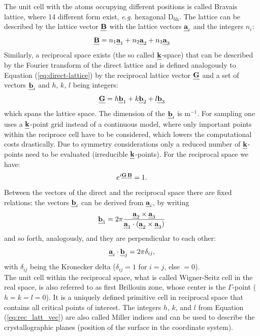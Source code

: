\documentclass[11pt,DIV=13,BCOR=5mm,a4paper,headinclude]{scrbook}
\def\mathbi#1{\textbf{\em #1}}
\renewcommand{\vec}[1]{\mathbi{#1}}
\begin{document}
The unit cell with the atoms occupying different positions is called Bravais lattice, where 14 different form exist, \textit{e.g.} hexagonal D$_\textrm{6h}$.
The lattice can be described by the lattice vector $\vec{B}$ with the lattice vectors $\vec{a}_i$ and the integers $n_i$:
\begin{equation}\label{eq:direct-lattice}
 \vec{B}=n_1\vec{a}_1+n_2\vec{a}_2+n_3\vec{a}_3
\end{equation}
Similarly, a reciprocal space exists (the so called $\vec{k}$-space) that can be described by the Fourier transform of the direct lattice and is defined analogously to Equation (\ref{eq:direct-lattice}) by the reciprocal lattice vector $\vec{G}$ and a set of vectors $\vec{b}_i$ and $h$, $k$, $l$ being integers:
\begin{equation}\label{eq:rec_latt_vec}
 \vec{G}=h\vec{b}_1+k\vec{b}_2+l\vec{b}_3
\end{equation}
which spans the lattice space.
The dimension of the $\vec{b}_i$ is m$^{-1}$.
For sampling one uses a $\vec{k}$-point grid instead of a continuous model, where only important points within the reciproce cell have to be considered, which lowers the computational costs drastically.
Due to symmetry considerations only a reduced number of $\vec{k}$-points need to be evaluated (irreducible $\vec{k}$-points).
 For the reciprocal space we have:
\begin{equation}
 e^{i\vec{G}\,\vec{B}}=1.
\end{equation}
Between the vectors of the direct and the reciprocal space there are fixed relations: the vectors $\vec{b}_i$  can be derived from $\vec{a}_i$, by writing
\begin{equation}
\vec{b}_1=2\pi\frac{\vec{a}_2 \times \vec{a}_3}{\vec{a}_1\cdot(\vec{a}_2 \times \vec{a}_3)} 
\end{equation}
and so forth, analogously, and they are perpendicular to each other:
\begin{equation}
 \vec{a}_i\cdot\vec{b}_j=2\pi\delta_{ij},
\end{equation} 
with $\delta_{ij}$ being the Kronecker delta ($\delta_{ij}=1$ for $i=j$, else $=0$).
\\
The unit cell within the reciprocal space, what is called Wigner-Seitz cell in the real space, is also referred to as first Brillouin zone, whose center is the $\Gamma$-point ($h=k=l=0$).
It is a uniquely defined primitive cell in reciprocal space that contains all critical points of interest.
The integers $h$, $k$, and $l$ from Equation (\ref{eq:rec_latt_vec}) are also called Miller indices and can be used to describe the crystallographic planes (position of the surface in the coordinate system).
\end{document}
